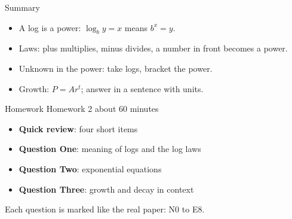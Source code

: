 \documentclass[aspectratio=169,11pt,xcolor=table,t]{beamer}
\newcommand\hp[1]{\fref{Handout p.\pageref{H-#1}}}
\begin{document}
\begin{frame}{Summary}
\relax
\begin{itemize}
\item A log is a power: $\log_{b} y = x$ means $b^{x} = y$.
\item Laws: plus multiplies, minus divides, a number in front becomes a power.
\item Unknown in the power: take logs, bracket the power.
\item Growth: $P = Ar^{t}$; answer in a sentence with units.
\end{itemize}
\hp{h2:meaning}
\end{frame}

\begin{frame}{Homework}
\relax
Homework 2 \textperiodcentered{} about 60 minutes
\begin{itemize}
\item \textbf{Quick review}: four short items
\item \textbf{Question One}: meaning of logs and the log laws
\item \textbf{Question Two}: exponential equations
\item \textbf{Question Three}: growth and decay in context
\end{itemize}
Each question is marked like the real paper: N0 to E8.
\end{frame}
\end{document}
